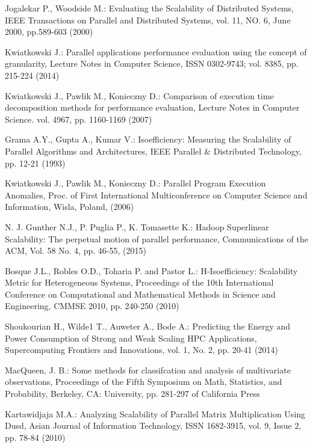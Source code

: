 \documentclass[runningheads]{llncs}
\begin{document}
\begin{thebibliography}{[10]}

 Jogalekar P., Woodside M.: Evaluating the Scalability of Distributed Systems, IEEE Transactions on Parallel and Distributed Systems, vol. 11, NO. 6, June 2000, pp.589-603  (2000)

 Kwiatkowski J.: Parallel applications performance evaluation using the concept of granularity, Lecture Notes in Computer Science, ISSN 0302-9743; vol. 8385, pp. 215-224  (2014)

 Kwiatkowski J., Pawlik M., Konieczny D.: Comparison of execution time decomposition methods for performance evaluation, Lecture Notes in Computer Science. vol. 4967, pp. 1160-1169  (2007)

 Grama A.Y., Gupta A., Kumar V.: Isoefficiency: Measuring the Scalability of Parallel Algorithms and Architectures, IEEE Parallel {\&} Distributed Technology, pp. 12-21 (1993)

 Kwiatkowski J., Pawlik M., Konieczny D.: Parallel Program Execution Anomalies, Proc. of First International Multiconference on Computer Science and Information, Wisla, Poland, (2006)

 N. J. Gunther N.J., P. Puglia P.,  K. Tomasette K.: Hadoop Superlinear Scalability: The perpetual motion of parallel performance, Communications of the ACM, Vol. 58 No. 4, pp. 46-55, (2015)

 Bosque J.L., Robles O.D., Toharia P. and Pastor L.: H-Isoefficiency: Scalability Metric for Heterogeneous Systems, Proceedings of the 10th International Conference on Computational and Mathematical Methods
in Science and Engineering, CMMSE 2010, pp. 240-250 (2010)

 Shoukourian H., Wilde1 T., Auweter A., Bode A.: Predicting the Energy and Power Consumption of Strong and Weak Scaling HPC Applications, Supercomputing Frontiers and Innovations, vol. 1, No. 2, pp. 20-41  (2014)
 
 MacQueen, J. B.: Some methods for classifcation and analysis of multivariate observations, Proceedings of the Fifth Symposium on Math, Statistics, and Probability, Berkeley, CA: University, pp. 281-297
of California Press

 Kartawidjaja M.A.: Analyzing Scalability of Parallel Matrix Multiplication Using Dusd, Asian Journal of Information Technology, ISSN 1682-3915, vol. 9, Issue 2, pp. 78-84 (2010)

\end{thebibliography}
\end{document}
